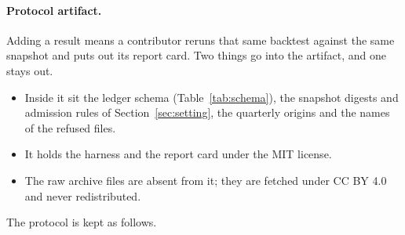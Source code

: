 \paragraph{Protocol artifact.} Adding a result means a contributor reruns that same backtest against the same snapshot and puts out its report card. Two things go into the artifact, and one stays out.
\begin{itemize}
\item Inside it sit the ledger schema (Table~\ref{tab:schema}), the snapshot digests and admission rules of Section~\ref{sec:setting}, the quarterly origins and the names of the refused files.
\item It holds the harness and the report card under the MIT license.
\item The raw archive files are absent from it; they are fetched under CC BY 4.0 and never redistributed.
\end{itemize}
The protocol is kept as follows.
